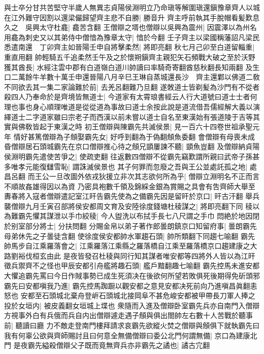 與士卒分甘共苦堅守半歲人無異志貞陽侯淵明立乃命瑱等解圍瑱還鎭豫章齊人以城在江外難守因割以還梁儼歸望齊主悲不自勝|{
	勝音升}
齊主呼前執其手脫帽看髪歎息久之　吳興太守杜龕|{
	龕苦含翻}
王僧辯之壻也僧辯以吳興為震州|{
	因震澤以為州名}
用龕為刺史又以其弟侍中僧愔為豫章太守|{
	愔於今翻}
壬子齊主以梁國稱藩詔凡梁民悉遣南還　丁卯齊主如晉陽壬申自將擊柔然|{
	將即亮翻}
秋七月己卯至白道留輜重|{
	重直用翻}
帥輕騎五千追柔然壬午及之於懷朔鎭齊主親犯矢石頻戰大破之至於沃野獲其酋長|{
	水經注雲中郡有白道嶺白道川帥讀曰率騎奇寄翻酋慈秋翻長知兩翻}
及生口二萬餘牛羊數十萬壬申還晉陽八月辛巳王琳自蒸城還長沙　齊主還鄴以佛道二敎不同欲去其一集二家論難於前|{
	去羌呂翻難乃旦翻}
遂敇道士皆剃髪為沙門有不從者殺四人乃奉命於是齊境皆無道士|{
	今道家有太霄琅書經云人行大道號曰道士士者何理也事也身心順理唯道是從從道為事故曰道士余按此說是道流借吾儒經解大義以演繹道士二字道家雖曰宗老子而西漢以前未嘗以道士自名至東漢始有張道陵于吉等其實與佛敎皆起于東漢之時}
初王僧辯與陳霸先共滅侯景|{
	見一百六十四卷世祖承聖元年}
情好甚篤僧辯為子頠娶霸先女|{
	好呼到翻為于偽翻頠魚委翻}
會僧辯有母喪未成昏僧辯居石頭城霸先在京口僧辯推心待之頠兄顗屢諫不聽|{
	顗魚豈翻}
及僧辯納貞陽侯淵明霸先遣使苦爭之|{
	使疏吏翻}
往返數四僧辯不從霸先竊歎謂所親曰武帝子孫甚多唯孝元能復讎雪恥|{
	謂誅滅侯景也}
其子何罪而忽廢之吾與王公並處託孤之地|{
	處昌呂翻}
而王公一旦改圖外依戎狄援立非次其志欲何所為乎|{
	僧辯立淵明名不正而言不順故姦雄得因以為資}
乃密具袍數千領及錦綵金銀為賞賜之具會有吿齊師大舉至夀春將入寇者僧辯遣記室江旰告霸先使為之備霸先因是留旰於京口|{
	旰古汗翻}
舉兵襲僧辯九月壬寅召部將侯安都周文育及安陸徐度錢塘杜稜謀之|{
	將即亮翻下同}
稜以為難霸先懼其謀泄以手巾絞稜|{
	今人盥洗以布拭手長七八尺謂之手巾}
悶絶於地因閉於别室部分將士|{
	分扶問翻}
分賜金帛以弟子著作郎曇朗鎮京口知留府事|{
	曇朗霸先母弟休先之子曇徒含翻}
使徐度侯安都帥水軍趨石頭|{
	帥所類翻下同趨七喻翻}
霸先帥馬步自江乘羅落會之|{
	江乘羅落江乘縣之羅落橋自江乘至羅落橋京口趨建康之大路劉裕伐桓玄由此}
是夜皆發召杜稜與同行知其謀者唯安都等四將外人皆以為江旰徵兵禦齊不之怪也甲辰安都引舟艦將趣石頭|{
	艦戶黯翻趣七喻翻}
霸先控馬未進安都大懼追霸先罵曰今日作賊事勢已成生死須决在後欲何所望若敗俱死後期得免斫頭邪霸先曰安都嗔我乃進|{
	霸先控馬踟蹰以觀安都之意見安都决死前向乃進嗔昌眞翻恚怒也}
安都至石頭城北棄舟登㟁石頭城北接岡阜不甚危峻安都被甲帶長刀軍人捧之投於女垣内|{
	被皮義翻女垣城上堞也}
衆隨而入進及僧辯卧室霸先兵亦自南門入僧辯方視事外白有兵俄而兵自内出僧辯遽走遇子頠與俱出閤帥左右數十人苦戰於聽事前|{
	聽讀曰廳}
力不敵走登南門樓拜請求哀霸先欲縱火焚之僧辯與頠俱下就執霸先曰我有何辜公欲與齊師賜討且曰何意全無備僧辯曰委公北門何謂無備|{
	京口為建康北門}
是夜霸先縊殺僧辯父子既而竟無齊兵亦非霸先之譎也|{
	譎古宂翻}
